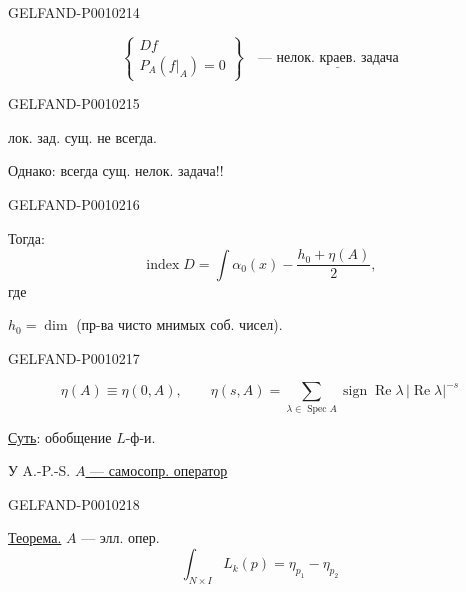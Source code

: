 \begin{GelfandAdjacentEvidence}{GELFAND-P001021}{4}


\begin{equation}
\left\{
\begin{aligned}
Df\\
P_A(f|_A)=0
\end{aligned}
\right\}
\quad\text{--- }\underline{\text{нелок. краев. задача}}
\tag{15}
\end{equation}
\end{GelfandAdjacentEvidence}
\begin{GelfandAdjacentEvidence}{GELFAND-P001021}{5}


лок. зад. сущ. не всегда.

Однако: всегда сущ. нелок. задача!!
\end{GelfandAdjacentEvidence}
\begin{GelfandAdjacentEvidence}{GELFAND-P001021}{6}


Тогда:
\begin{equation}
\operatorname{index}D=\int\alpha_0(x)-\frac{h_0+\eta(A)}{2},
\tag{16}
\end{equation}
где

$h_0=\dim$ (пр-ва чисто мнимых соб. чисел).
\end{GelfandAdjacentEvidence}
\begin{GelfandAdjacentEvidence}{GELFAND-P001021}{7}

\begin{equation}
\eta(A)\equiv\eta(0,A),\qquad
\eta(s,A)=\sum_{\lambda\in\operatorname{Spec}A}
\operatorname{sign}\operatorname{Re}\lambda\,
|\operatorname{Re}\lambda|^{-s}
\tag{17}
\end{equation}

\underline{Суть}: обобщение $L$-ф-и.

У A.-P.-S. \underline{$A$ --- самосопр. оператор}
\end{GelfandAdjacentEvidence}
\begin{GelfandAdjacentEvidence}{GELFAND-P001021}{8}


\underline{Теорема.} $A$ --- элл. опер.
\[
\int_{N\times I}L_k(p)=\eta_{p_1}-\eta_{p_2}
\]
\end{GelfandAdjacentEvidence}
